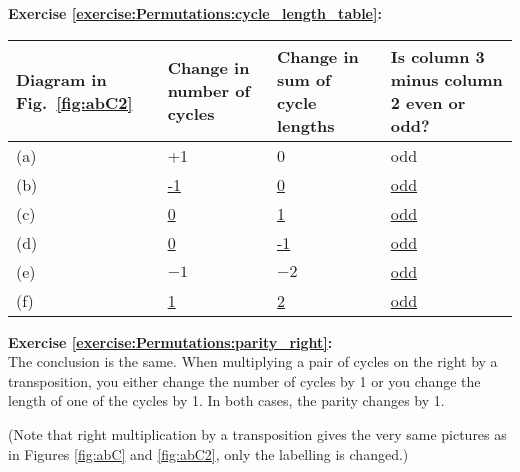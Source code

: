 \noindent\textbf{Exercise  \ref{exercise:Permutations:cycle_length_table}:}
\begin{table}[!htb]
\begin{tabular}{|p{1.6cm}|p{2.7cm}|p{2.7cm}|p{3.5cm}|}
\hline 
\rule{0pt}{2.6ex} Diagram in Fig.~\ref{fig:abC2}&  Change in number of cycles   & Change in sum of cycle lengths & Is column 3 minus column 2 even or odd?  \rule[-1.2ex]{0pt}{0pt} \tabularnewline
\hline
\hline 
\rule{0pt}{2.6ex} (a)  &  +1  & 0  & odd \rule[-1.2ex]{0pt}{0pt} \tabularnewline
\hline 
\rule{0pt}{2.6ex} (b)  &  \underline{-1} & \underline{0} & \underline{odd} \rule[-1.2ex]{0pt}{0pt} \tabularnewline
\hline 
\rule{0pt}{2.6ex} (c)  &  \underline{0} & \underline{1}  & \underline{odd} \rule[-1.2ex]{0pt}{0pt} \tabularnewline
\hline 
\rule{0pt}{2.6ex} (d)  &  \underline{0} & \underline{-1}  & \underline{odd} \rule[-1.2ex]{0pt}{0pt} \tabularnewline
\hline 
\rule{0pt}{2.6ex} (e)  & $-1$ & $-2$ & \underline{odd} \rule[-1.2ex]{0pt}{0pt} \tabularnewline
\hline 
\rule{0pt}{2.6ex} (f)  &  \underline{1} & \underline{2} & \underline{odd}  \rule[-1.2ex]{0pt}{0pt} \tabularnewline
\hline 
\end{tabular}
\end{table}

\noindent\textbf{Exercise  \ref{exercise:Permutations:parity_right}:}\\ %
The conclusion is the same. When multiplying a pair of cycles on the right by a transposition, you either change the number of cycles by 1 or you change the length of one of the cycles by 1. In both cases, the parity changes by 1.

(Note that right multiplication by a transposition gives the very same pictures as in Figures \ref{fig:abC} and \ref{fig:abC2}, only the labelling is changed.)


